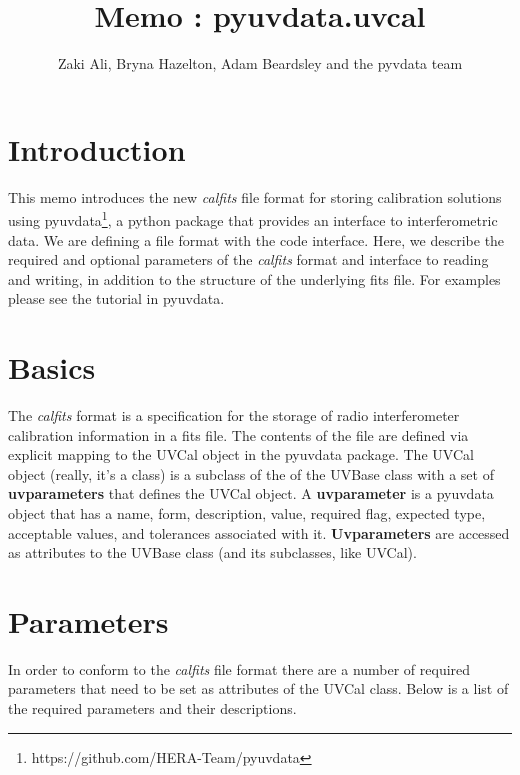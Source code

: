 \documentclass[11pt, oneside]{article}   	%
\title{Memo : pyuvdata.uvcal}
\author{Zaki Ali, Bryna Hazelton, Adam Beardsley and the pyvdata team}
\begin{document}
\maketitle
\section{Introduction}
This memo introduces the new \textit{calfits} file format for storing
calibration solutions using
pyuvdata\footnote{https://github.com/HERA-Team/pyuvdata}, a python package that
provides an interface to interferometric data. We are defining a file format
with the code interface. Here, we describe the required and optional parameters
of the \textit{calfits} format and interface to reading and writing, in addition
to the structure of the underlying fits file. For examples please see the
tutorial in pyuvdata.

\section{Basics}

The \textit{calfits} format is a specification for the storage of radio
interferometer calibration information in a fits file.  The contents of the file
are defined via explicit mapping to the UVCal object in the pyuvdata package.
The UVCal object (really, it's a class) is a subclass of the of the UVBase class
with a set of \textbf{uvparameters} that defines the UVCal object. A
\textbf{uvparameter} is a pyuvdata object that has a name, form, description,
value, required flag, expected type, acceptable values, and tolerances
associated with it.  \textbf{Uvparameters} are accessed as attributes to the
UVBase class (and its subclasses, like UVCal).

\section{Parameters}
In order to conform to the \textit{calfits} file format there are a number of
required parameters that need to be set as attributes of the UVCal class. Below
is a list of the required parameters and their descriptions.
\end{document}
